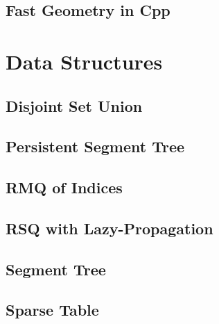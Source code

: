 \subsection{Fast Geometry in Cpp}
\raggedbottom
\hrulefill

\section{Data Structures}
\subsection{Disjoint Set Union}
\raggedbottom
\hrulefill
\subsection{Persistent Segment Tree}
\raggedbottom
\hrulefill
\subsection{RMQ of Indices}
\raggedbottom
\hrulefill
\subsection{RSQ with Lazy-Propagation}
\raggedbottom
\hrulefill
\subsection{Segment Tree}
\raggedbottom
\hrulefill
\subsection{Sparse Table}
\raggedbottom
\hrulefill

